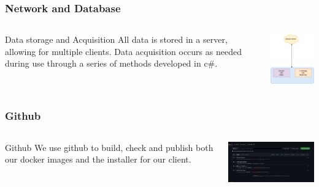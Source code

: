 \documentclass{beamer}
\begin{document}
\begin{frame}
    \frametitle{Network and Database}

    \begin{columns}
        \begin{column}{0.48\textwidth}
            \begin{block}{Data storage and Acquisition}
                All data is stored in a server, allowing for multiple clients. Data acquisition occurs as needed during use through a series of methods developed in c\#.
            \end{block}
        \end{column}
        \begin{column}{0.48\textwidth}
            \includegraphics[width=5cm]{Simple Diagram.png}
        \end{column}
    \end{columns}
\end{frame}

\begin{frame}
    \frametitle{Github}

    \begin{columns}
        \begin{column}{0.28\textwidth}
            \begin{block}{Github}
                We use github to build, check and publish both our docker images and the installer for our client.
            \end{block}
        \end{column}
        \begin{column}{0.58\textwidth}
            \includegraphics[width=7cm]{github.png}
        \end{column}
    \end{columns}
\end{frame}
\end{document}
